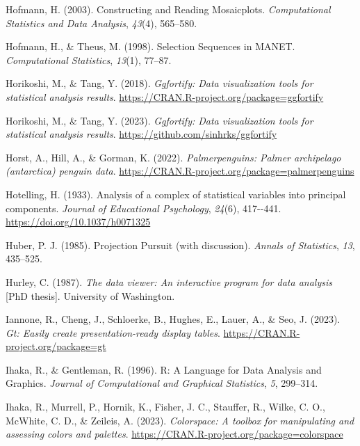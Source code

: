 \documentclass[
  letterpaper,
]{krantz}
\newlength{\cslhangindent}
\newenvironment{CSLReferences}[2] %
 {\begin{list}{}{%
  \setlength{\itemindent}{0pt}
  \setlength{\leftmargin}{0pt}
  \setlength{\parsep}{0pt}
  \ifodd #1
   \setlength{\leftmargin}{\cslhangindent}
   \setlength{\itemindent}{-1\cslhangindent}
  \fi
  \setlength{\itemsep}{#2\baselineskip}}}
 {\end{list}}
\begin{document}
\begin{CSLReferences}{1}{0}
Hofmann, H. (2003). Constructing and {R}eading {M}osaicplots.
\emph{Computational Statistics and Data Analysis}, \emph{43}(4),
565--580.

Hofmann, H., \& Theus, M. (1998). Selection {S}equences in {MANET}.
\emph{Computational Statistics}, \emph{13}(1), 77--87.

Horikoshi, M., \& Tang, Y. (2018). \emph{Ggfortify: Data visualization
tools for statistical analysis results}.
\url{https://CRAN.R-project.org/package=ggfortify}

Horikoshi, M., \& Tang, Y. (2023). \emph{Ggfortify: Data visualization
tools for statistical analysis results}.
\url{https://github.com/sinhrks/ggfortify}

Horst, A., Hill, A., \& Gorman, K. (2022). \emph{Palmerpenguins: Palmer
archipelago (antarctica) penguin data}.
\url{https://CRAN.R-project.org/package=palmerpenguins}

Hotelling, H. (1933). Analysis of a complex of statistical variables
into principal components. \emph{Journal of Educational Psychology},
\emph{24}(6), 417-\/-441. \url{https://doi.org/10.1037/h0071325}

Huber, P. J. (1985). {P}rojection {P}ursuit (with discussion).
\emph{Annals of Statistics}, \emph{13}, 435--525.

Hurley, C. (1987). \emph{The data viewer: An interactive program for
data analysis} {[}PhD thesis{]}. University of Washington.

Iannone, R., Cheng, J., Schloerke, B., Hughes, E., Lauer, A., \& Seo, J.
(2023). \emph{Gt: Easily create presentation-ready display tables}.
\url{https://CRAN.R-project.org/package=gt}

Ihaka, R., \& Gentleman, R. (1996). R: {A} {L}anguage for {D}ata
{A}nalysis and {G}raphics. \emph{Journal of Computational and Graphical
Statistics}, \emph{5}, 299--314.

Ihaka, R., Murrell, P., Hornik, K., Fisher, J. C., Stauffer, R., Wilke,
C. O., McWhite, C. D., \& Zeileis, A. (2023). \emph{Colorspace: A
toolbox for manipulating and assessing colors and palettes}.
\url{https://CRAN.R-project.org/package=colorspace}


\end{CSLReferences}
\end{document}
